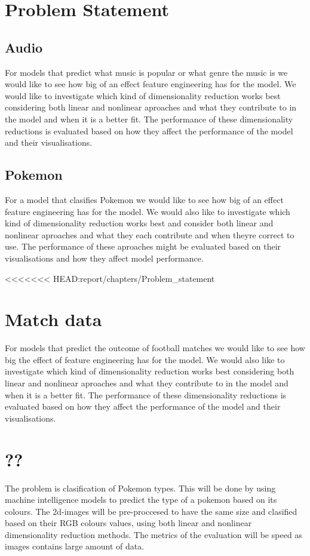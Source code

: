 \section{Problem Statement}\label{sec:problem-statement}
\subsection{Audio} 
For models that predict what music is popular or what genre the music is we would like to see how big of an effect feature engineering has for the model. We would like to investigate which kind of dimensionality reduction works best considering both linear and nonlinear aproaches and what they contribute to in the model and when it is a better fit. The performance of these dimensionality reductions is evaluated based on how they affect the performance of the model and their visualisations.

\subsection{Pokemon}
For a model that clasifies Pokemon we would like to see how big of an effect feature engineering has for the model. We would also like to investigate which kind of dimensionality reduction works best and consider both linear and nonlinear aproaches and what they each contribute and when theyre correct to use. The performance of these aproaches might be evaluated based on their visualisations and how they affect model performance.

<<<<<<< HEAD:report/chapters/Problem_statement
\section{Match data}
For models that predict the outcome of football matches we would like to see how big the effect of feature engineering has for the model. We would also like to investigate which kind of dimensionality reduction works best considering both linear and nonlinear aproaches and what they contribute to in the model and when it is a better fit. The performance of these dimensionality reductions is evaluated based on how they affect the performance of the model and their visualisations.

\section{??}
The problem is clasification of Pokemon types. This will be done by using machine intelligence models to predict the type of a pokemon based on its colours. The 2d-images will be pre-proccesed to have the same size and clasified based on their RGB colours values, using both linear and nonlinear dimensionality reduction methods. The metrics of the evaluation will be speed as images contains large amount of data. 

